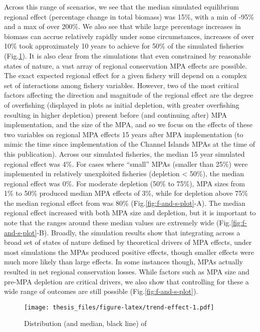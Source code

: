 \documentclass[twoside,12pt,final]{ucthesis-CA2012}
\begin{document}
\begin{ucmainmatter}
Across this range of scenarios, we see that the median simulated
equilibrium regional effect (percentage change in total biomass) was
15\%, with a min of -95\% and a max of over 200\%. We also see that
while large percentage increases in biomass can accrue relatively
rapidly under some circumstances, increases of over 10\% took
approximately 10 years to achieve for 50\% of the simulated fisheries
(Fig.\ref{fig:trend-effect}). It is also clear from the simulations that
even constrained by reasonable states of nature, a vast array of
regional conservation MPA effects are possible. The exact expected
regional effect for a given fishery will depend on a complex set of
interactions among fishery variables. However, two of the most critical
factors affecting the direction and magnitude of the regional effect are
the degree of overfishing (displayed in plots as initial depletion, with
greater overfishing resulting in higher depletion) present before (and
continuing after) MPA implementation, and the size of the MPA, and so we
focus on the effects of these two variables on regional MPA effects 15
years after MPA implementation (to mimic the time since implementation
of the Channel Islands MPAs at the time of this publication). Across our
simulated fisheries, the median 15 year simulated regional effect was
4\%. For cases where ``small'' MPAs (smaller than 25\%) were implemented
in relatively unexploited fisheries (depletion \textless{} 50\%), the
median regional effect was 0\%. For moderate depletion (50\% to 75\%),
MPA sizes from 1\% to 50\% produced median MPA effects of 3\%, while for
depletion above 75\% the median regional effect from was 80\%
(Fig.\ref{fig:f-and-s-plot}-A). The median regional effect increased
with both MPA size and depletion, but it is important to note that the
ranges around these median values are extremely wide
(Fig.\ref{fig:f-and-s-plot}-B). Broadly, the simulation results show
that integrating across a broad set of states of nature defined by
theoretical drivers of MPA effects, under most simulations the MPAs
produced positive effects, though smaller effects were much more likely
than large effects. In some instances though, MPAs actually resulted in
net regional conservation losses. While factors such as MPA size and
pre-MPA depletion are critical drivers, we also show that controlling
for these a wide range of outcomes are still possible
(Fig.\ref{fig:f-and-s-plot}).
\begin{figure}
\centering
\texttt{[image: thesis\_files/figure-latex/trend-effect-1.pdf]}
\caption{\label{fig:trend-effect}Distribution (and median, black line) of
}
\end{figure}
\end{ucmainmatter}
\end{document}
